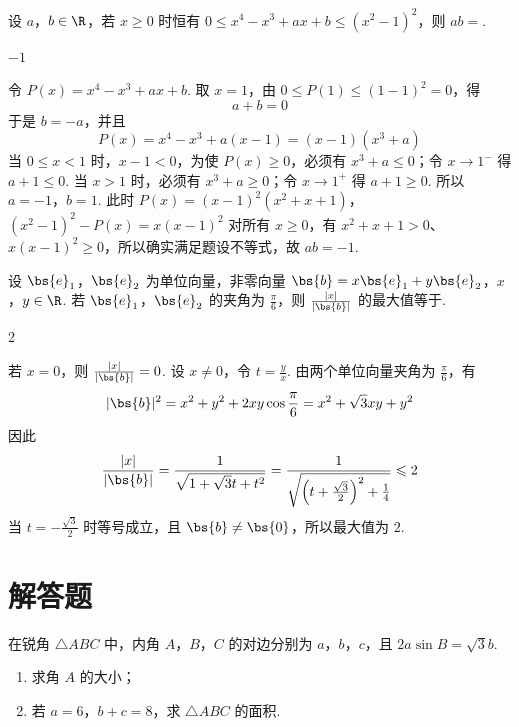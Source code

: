 \begin{problem}
设 \(a\)，\(b \in \R\)，若 \(x \geqslant 0\) 时恒有 \(0 \leqslant x^4 - x^3 + ax + b \leqslant (x^2 - 1)^2\)，则 \(ab = \)\fillinblank{}.
\end{problem}

\begin{answer}
\(-1\)
\end{answer}

\begin{solution}
令 \(P(x)=x^4-x^3+ax+b\). 取 \(x=1\)，由
\(0\leqslant P(1)\leqslant(1-1)^2=0\)，得
\[
a+b=0
\]
于是 \(b=-a\)，并且
\[
P(x)=x^4-x^3+a(x-1)=(x-1)(x^3+a)
\]
当 \(0\leqslant x<1\) 时，\(x-1<0\)，为使 \(P(x)\geqslant0\)，必须有 \(x^3+a\leqslant0\)；令 \(x\to1^-\) 得 \(a+1\leqslant0\). 当 \(x>1\) 时，必须有 \(x^3+a\geqslant0\)；令 \(x\to1^+\) 得 \(a+1\geqslant0\). 所以 \(a=-1\)，\(b=1\). 此时
\(P(x)=(x-1)^2(x^2+x+1)\)，\((x^2-1)^2-P(x)=x(x-1)^2\)
对所有 \(x\geqslant0\)，有 \(x^2+x+1>0\)、\(x(x-1)^2\geqslant0\)，所以确实满足题设不等式，故 \(ab=-1\).
\end{solution}

\begin{problem}
设 \(\bs{e}_1\)，\(\bs{e}_2\) 为单位向量，非零向量 \(\bs{b} = x\bs{e}_1 + y\bs{e}_2\)，\(x\)，\(y \in \R\). 若 \(\bs{e}_1\)，\(\bs{e}_2\) 的夹角为 \(\frac{\pi}{6}\)，则 \(\frac{|x|}{|\bs{b}|}\) 的最大值等于\fillinblank{}.
\end{problem}

\begin{answer}
2
\end{answer}

\begin{solution}
若 \(x=0\)，则 \(\frac{|x|}{|\bs{b}|}=0\). 设 \(x\ne0\)，令 \(t=\frac{y}{x}\). 由两个单位向量夹角为 \(\frac{\pi}{6}\)，有
\[
|\bs{b}|^2=x^2+y^2+2xy\cos\frac{\pi}{6}=x^2+\sqrt3xy+y^2
\]
因此
\[
\frac{|x|}{|\bs{b}|}
=\frac{1}{\sqrt{1+\sqrt3t+t^2}}
=\frac{1}{\sqrt{\left(t+\frac{\sqrt3}{2}\right)^2+\frac14}}
\leqslant2
\]
当 \(t=-\frac{\sqrt3}{2}\) 时等号成立，且 \(\bs{b}\ne\bs{0}\)，所以最大值为 \(2\).
\end{solution}

\section{解答题}

\begin{problem}
在锐角 \(\triangle ABC\) 中，内角 \(A\)，\(B\)，\(C\) 的对边分别为 \(a\)，\(b\)，\(c\)，且 \(2a \sin B = \sqrt{3} b\).
\begin{enumerate}
\item 求角 \(A\) 的大小；
\item 若 \(a = 6\)，\(b + c = 8\)，求 \(\triangle ABC\) 的面积.
\end{enumerate}
\end{problem}

